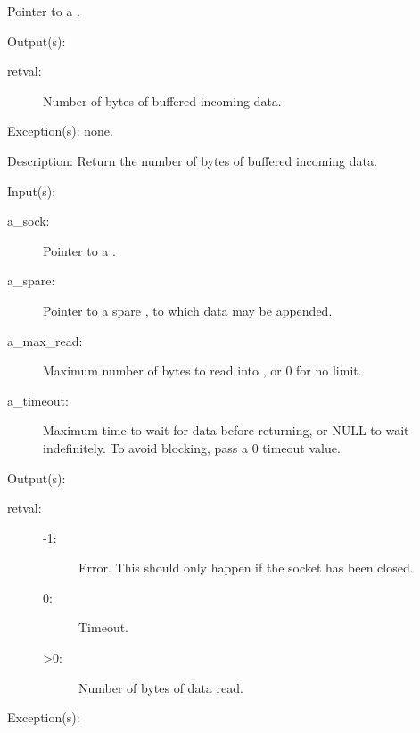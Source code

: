 \begin{capi}
\begin{capilist}
\begin{description}
			Pointer to a .
		\end{description}
	\item[Output(s): ]
		\begin{description}\item[]
		\item[retval: ]
			Number of bytes of buffered incoming data.
		\end{description}
	\item[Exception(s): ] none.
	\item[Description: ]
		Return the number of bytes of buffered incoming data.
	\end{capilist}
\label{sock_read}
	\begin{capilist}
	\item[Input(s): ]
		\begin{description}\item[]
		\item[a\_sock: ]
			Pointer to a .
		\item[a\_spare: ]
			Pointer to a spare , to which data may be
			appended.
		\item[a\_max\_read: ]
			Maximum number of bytes to read into , or
			0 for no limit.
		\item[a\_timeout: ]
			Maximum time to wait for data before returning, or NULL
			to wait indefinitely.  To avoid blocking, pass a 0
			timeout value.
		\end{description}
	\item[Output(s): ]
		\begin{description}\item[]
		\item[retval: ]
			\begin{description}\item[]
			\item[-1: ]
				Error.  This should only happen if the socket
				has been closed.
			\item[0: ]
				Timeout.
			\item[>0: ]
				Number of bytes of data read.
			\end{description}
		\end{description}
	\item[Exception(s): ]
		\begin{description}\item[]

\end{description}
\end{capilist}
\end{capi}

